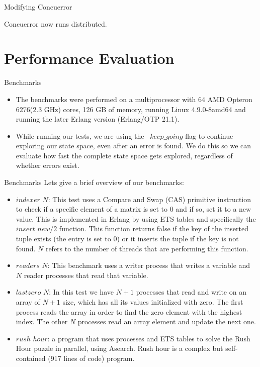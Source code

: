 \documentclass[9pt]{beamer}
\begin{document}
\begin{frame} {Modifying Concuerror}

Concuerror now runs distributed.

\end{frame}

\section{Performance Evaluation}



\begin{frame}{Benchmarks}

\begin{itemize}
\item The benchmarks were performed on a multiprocessor with 64 AMD Opteron 6276(2.3 GHz) cores, 126 GB of memory, running
Linux 4.9.0-8amd64 and running the later Erlang version (Erlang/OTP 21.1). 
\item While running our tests, we are using the
--$keep\_going$ flag to continue exploring our state space, even after an error is found. We do this so we can evaluate
how fast the complete state space gets explored, regardless of whether errors exist.
\end{itemize}

\end{frame}


\begin{frame} {Benchmarks}
Lets give a brief overview of our benchmarks:

\begin{itemize}
    \item $indexer$ $N$: This test uses a Compare and Swap (CAS) primitive instruction to check if a specific element of
    a matrix is set to 0 and if so, set it to a new value. This is implemented in Erlang by using ETS tables and specifically
    the $insert\_new/2$ function. This function returns false if the key of the inserted tuple exists (the entry is set to 0)
    or it inserts the tuple if the key is not found. $N$ refers to the number of threads that are performing this function.
    \item $readers$ $N$: This benchmark uses a writer process that writes a variable and $N$ reader processes that read that variable.
    \item $lastzero$ $N$: In this test we have $N+1$ processes that read and write on an array of $N+1$ size, which has all its 
    values initialized with zero. The first process reads the array in order to find the zero element with the highest
    index. The other $N$ processes read an array element and update the next one.
    \item $rush$ $hour$: a program that uses processes and
    ETS tables to solve the Rush Hour puzzle in parallel, using A\textasteriskcentered  search. Rush hour is a complex but self-contained (917 lines of code) program.
\end{itemize}

\end{frame}
\end{document}
